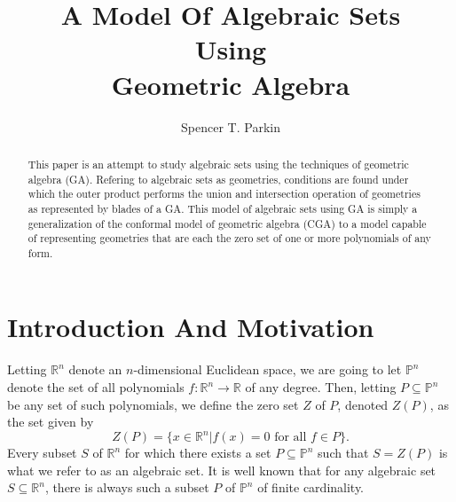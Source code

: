 \documentclass{birkjour}
\theoremstyle{definition}
\theoremstyle{remark}
\numberwithin{equation}{section}
\newcommand{\R}{\mathbb{R}}
\newcommand{\Poly}{\mathbb{P}}
\begin{document}
\title{A Model Of Algebraic Sets\\Using\\Geometric Algebra}

\author{Spencer T. Parkin}





\begin{abstract}
This paper is an attempt to study algebraic sets using
the techniques of geometric algebra (GA).  Refering to
algebraic sets as geometries, conditions are
found under which the outer product performs the
union and intersection operation of geometries as
represented by blades of a GA.
This model of algebraic sets using GA
is simply a generalization of the conformal model of
geometric algebra (CGA) to a model capable of representing
geometries that are each the zero set of one or more
polynomials of any form.
\end{abstract}

\maketitle

\section{Introduction And Motivation}

Letting $\R^n$ denote an $n$-dimensional Euclidean space, we are
going to let $\Poly^n$ denote the set of all polynomials $f:\R^n\to\R$
of any degree.  Then, letting $P\subseteq\Poly^n$ be any set of such
polynomials, we define the zero set $Z$ of $P$, denoted $Z(P)$,
as the set given by
\begin{equation}\label{equ_zero_set_of_polys}
Z(P) = \{x\in\R^n|\mbox{$f(x)=0$ for all $f\in P$}\}.
\end{equation}
Every subset $S$ of $\R^n$ for which there exists a set $P\subseteq\Poly^n$
such that $S=Z(P)$ is what we refer to as an algebraic set.  It is well known
that for any algebraic set $S\subseteq\R^n$, there is always such a subset $P$
of $\Poly^n$ of finite cardinality.
\end{document}
